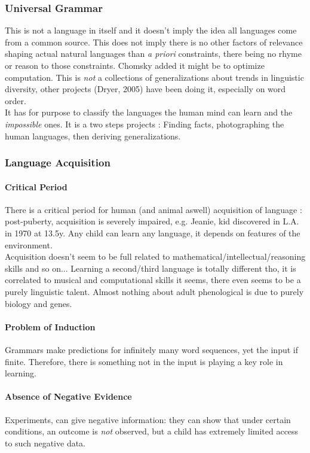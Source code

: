 \documentclass{cours}
\begin{document}
\subsubsection{Universal Grammar}
This is not a language in itself and it doesn't imply the idea all languages come from a common source. This does not imply there is no other factors of relevance shaping actual natural languages than \textsl{a priori} constraints, there being no rhyme or reason to those constraints. Chomsky added it might be to optimize computation. This is \emph{not} a collections of generalizations about trends in linguistic diversity, other projects (Dryer, 2005) have been doing it, especially on word order. \\
It has for purpose to classify the languages the human mind can learn and the \textit{impossible} ones. It is a two steps projects\! : Finding facts, photographing the human languages, then deriving generalizations.

\subsubsection{Language Acquisition}
\paragraph{Critical Period}\label{par:critical-period}
There is a critical period for human (and animal aswell) acquisition of language\! : post-puberty, acquisition is severely impaired, e.g. Jeanie, kid discovered in L.A. in 1970 at 13.5y. Any child can learn any language, it depends on features of the environment.\\
Acquisition doesn't seem to be full related to mathematical/intellectual/reasoning skills and so on... Learning a second/third language is totally different tho, it is correlated to musical and computational skills it seems, there even seems to be a purely linguistic talent. Almost nothing about adult phenological is due to purely biology and genes.

\paragraph{Problem of Induction}
Grammars make predictions for infinitely many word sequences, yet the input if finite. Therefore, there is something not in the input is playing a key role in learning.

\paragraph{Absence of Negative Evidence}
Experiments, can give negative information\!: they can show that under certain conditions, an outcome is \emph{not} observed, but a child has extremely limited access to such negative data.
\end{document}
